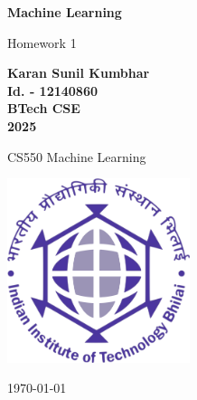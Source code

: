 \documentclass[10pt, a4paper]{article}
\newcommand\course{CS550 Machine Learning}                            %
\newcommand\hwnumber{ 1}                                 %
\newcommand\Information{Karan Sunil Kumbhar }                        %
\newcommand\Informatio{Id. - 12140860}
\newcommand\Informati{BTech CSE}
\newcommand\Informat{2025}
\begin{document}
\begin{titlepage}
    \begin{center}
        \vspace*{3cm}
            
        \Huge
        \textbf{Machine Learning}
            
        \vspace{1cm}
        \huge
        Homework\hwnumber
            
        \vspace{1.5cm}
        \Large
            
        \textbf{\Information}\\                      %
        \textbf{\Informatio}\\
        \textbf{\Informati} \\
        \textbf{\Informat} \\
            
        \vfill
        
         \course \ 
            
        \vspace{1cm}
            
        \includegraphics[width=0.4\textwidth]{iitbh.png}
        \\
        
        \Large
        
        \today
            
    \end{center}
\end{titlepage}

\newpage
\begin{Problem}
\end{Problem}
\end{document}
